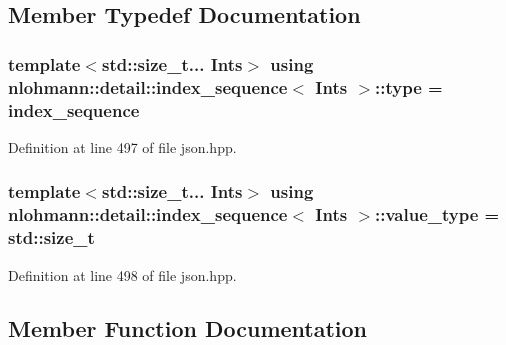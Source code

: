 \subsection{Member Typedef Documentation}
\subsubsection[{\texorpdfstring{type}{type}}]{\setlength{\rightskip}{0pt plus 5cm}template$<$std\+::size\+\_\+t... Ints$>$ using {\bf nlohmann\+::detail\+::index\+\_\+sequence}$<$ Ints $>$\+::{\bf type} =  {\bf index\+\_\+sequence}}\hypertarget{structnlohmann_1_1detail_1_1index__sequence_a3c14c4ab277de72b166806193ff4fa10}{}\label{structnlohmann_1_1detail_1_1index__sequence_a3c14c4ab277de72b166806193ff4fa10}


Definition at line 497 of file json.\+hpp.

\subsubsection[{\texorpdfstring{value\+\_\+type}{value_type}}]{\setlength{\rightskip}{0pt plus 5cm}template$<$std\+::size\+\_\+t... Ints$>$ using {\bf nlohmann\+::detail\+::index\+\_\+sequence}$<$ Ints $>$\+::{\bf value\+\_\+type} =  std\+::size\+\_\+t}\hypertarget{structnlohmann_1_1detail_1_1index__sequence_a2eca43d08fc1eb68bd5fa75b6714d21d}{}\label{structnlohmann_1_1detail_1_1index__sequence_a2eca43d08fc1eb68bd5fa75b6714d21d}


Definition at line 498 of file json.\+hpp.



\subsection{Member Function Documentation}
